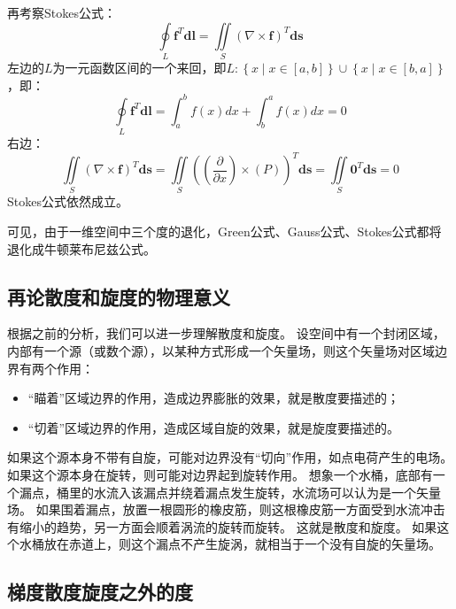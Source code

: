 再考察Stokes公式：
\[
\oint\limits_L{\boldsymbol{f}^T\boldsymbol{dl}}=\iint\limits_S{\left( \nabla \times \boldsymbol{f} \right) ^T\boldsymbol{ds}}
\]
左边的$L$为一元函数区间的一个来回，即$L:\left\{ x \middle| x\in \left[ a,b \right] \right\} \cup \left\{ x \middle| x\in \left[ b,a \right] \right\} $，即：
\[
\oint\limits_L{\boldsymbol{f}^T\boldsymbol{dl}}=\int_a^b{f\left( x \right) dx}+\int_b^a{f\left( x \right) dx}=0
\]
右边：
\[
\iint\limits_S{\left( \nabla \times \boldsymbol{f} \right) ^T\boldsymbol{ds}}=\iint\limits_S{\left( \left( \frac{\partial}{\partial x} \right) \times \left( P \right) \right) ^T\mathbf{ds}}=\iint\limits_S{\mathbf{0}^T\boldsymbol{ds}}=0
\]
Stokes公式依然成立。

\begin{tcolorbox}
可见，由于一维空间中三个度的退化，Green公式、Gauss公式、Stokes公式都将退化成牛顿莱布尼兹公式。
\end{tcolorbox}

\subsection{再论散度和旋度的物理意义}

根据之前的分析，我们可以进一步理解散度和旋度。
设空间中有一个封闭区域，内部有一个源（或数个源），以某种方式形成一个矢量场，则这个矢量场对区域边界有两个作用：
\begin{itemize}
	\item “瞄着”区域边界的作用，造成边界膨胀的效果，就是散度要描述的；
	\item “切着”区域边界的作用，造成区域自旋的效果，就是旋度要描述的。
\end{itemize}

如果这个源本身不带有自旋，可能对边界没有“切向”作用，如点电荷产生的电场。
如果这个源本身在旋转，则可能对边界起到旋转作用。
想象一个水桶，底部有一个漏点，桶里的水流入该漏点并绕着漏点发生旋转，水流场可以认为是一个矢量场。
如果围着漏点，放置一根圆形的橡皮筋，则这根橡皮筋一方面受到水流冲击有缩小的趋势，另一方面会顺着涡流的旋转而旋转。
这就是散度和旋度。
如果这个水桶放在赤道上，则这个漏点不产生旋涡，就相当于一个没有自旋的矢量场。

\subsection{梯度散度旋度之外的度}

